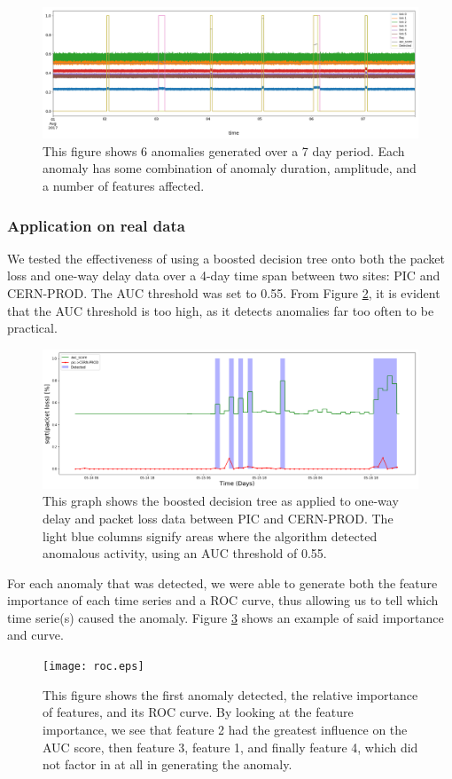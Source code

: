 \documentclass[5p]{elsarticle}
\begin{document}
\begin{figure}[htbp]
    \centering
    \includegraphics[width=\linewidth]{withauc.png}
    \caption{This figure shows 6 anomalies generated over a 7 day period. Each anomaly has some combination of anomaly duration, amplitude, and a number of features affected.}
    \label{fig:withauc}
\end{figure}

\subsubsection{Application on real data}

We tested the effectiveness of using a boosted decision tree onto both the packet loss and one-way delay data over a 4-day time span between two sites: PIC and CERN-PROD. The AUC threshold was set to 0.55. From Figure \ref{fig:BDTlow}, it is evident that the AUC threshold is too high, as it detects anomalies far too often to be practical.
\begin{figure}[htbp]
    \centering
    \includegraphics[width=1.0\linewidth]{BDT_lowcut.png}
    \caption{This graph shows the boosted decision tree as applied to one-way delay and packet loss data between PIC and CERN-PROD. The light blue columns signify areas where the algorithm detected anomalous activity, using an AUC threshold of 0.55.}
    \label{fig:BDTlow}
\end{figure}

For each anomaly that was detected, we were able to generate both the feature importance of each time series and a ROC curve, thus allowing us to tell which time serie(s) caused the anomaly. Figure \ref{fig:roc} shows an example of said importance and curve. 
\begin{figure}[htbp]
    \centering
    \texttt{[image: roc.eps]}
    \caption{This figure shows the first anomaly detected, the relative importance of features, and its ROC curve. By looking at the feature importance, we see that feature 2 had the greatest influence on the AUC score, then feature 3, feature 1, and finally feature 4, which did not factor in at all in generating the anomaly.}
    \label{fig:roc}
\end{figure}
\end{document}
